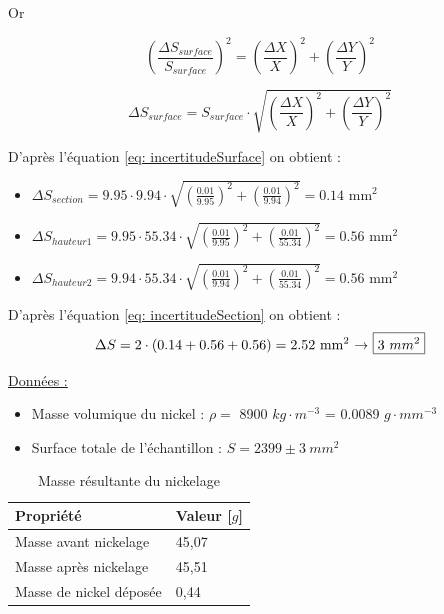 Or 

\begin{equation}
    \left(\frac{\Delta S_{surface}}{S_{surface}}\right)^2 = \left(\frac{\Delta X}{X}\right)^2 + \left(\frac{\Delta Y}{Y}\right)^2 
\end{equation}

\begin{equation}\label{eq: incertitudeSurface}
    \Delta S_{surface} = S_{surface} \cdot \sqrt{\left(\frac{\Delta X}{X}\right)^2 + \left(\frac{\Delta Y}{Y}\right)^2} 
\end{equation}


D'après l'équation \ref{eq: incertitudeSurface} on obtient :
\begin{itemize}
    \item $\Delta S_{section} = 9.95 \cdot 9.94\cdot \sqrt{\left(\frac{0.01}{9.95}\right)^2 + \left(\frac{0.01}{9.94}\right)^2}= 0.14 \text{ mm}^2$
    \item $\Delta S_{hauteur1} = 9.95 \cdot 55.34\cdot \sqrt{\left(\frac{0.01}{9.95}\right)^2 + \left(\frac{0.01}{55.34}\right)^2}= 0.56 \text{ mm}^2$
    \item $\Delta S_{hauteur2} = 9.94 \cdot 55.34\cdot \sqrt{\left(\frac{0.01}{9.94}\right)^2 + \left(\frac{0.01}{55.34}\right)^2}= 0.56 \text{ mm}^2$
\end{itemize}

\vspace{0.3cm}
D'après l'équation \ref{eq: incertitudeSection} on obtient :
\begin{equation}
    \Delta S = 2 \cdot (0.14 + 0.56 + 0.56) = 2.52 \text{ mm}^2 \text{ → } \text{\fbox{$3 \ mm^2$}}
\end{equation}

\underline{Données :}
\begin{itemize}
    \item Masse volumique du nickel : $\rho =$ 8900 $kg \cdot m^{-3}$ = 0.0089 $g \cdot mm^{-3}$
    \item Surface totale de l'échantillon : $S = 2399 \pm 3 \ mm ^2$
\end{itemize}


\begin{table}[H]
    \centering
    \begin{tabular}{|l|l|}
    \hline
    \rowcolor[HTML]{CBCEFB} 
    Propriété & Valeur [$g$]\\ \hline
    Masse avant nickelage & 45,07 \\ \hline
    Masse après nickelage  & 45,51 \\ \hline
    Masse de nickel déposée & 0,44 \\ \hline
    \end{tabular}
    \caption{Masse résultante du nickelage}
    \label{tab: masseNickel}
\end{table}

